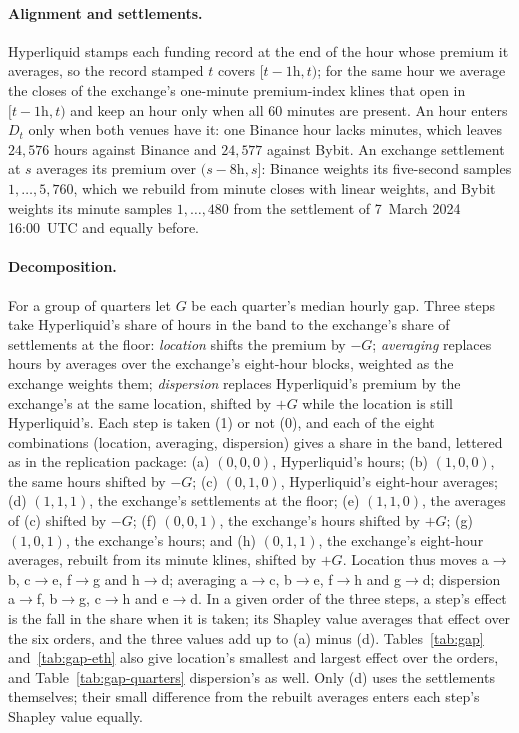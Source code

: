 \documentclass[10pt,a4paper]{article}
\begin{document}
\paragraph{Alignment and settlements.} Hyperliquid stamps each funding record at the end of the hour whose premium it averages, so the record stamped $t$ covers $[t-1\text{h}, t)$; for the same hour we average the closes of the exchange's one-minute premium-index klines that open in $[t-1\text{h}, t)$ and keep an hour only when all $60$ minutes are present. An hour enters $D_t$ only when both venues have it: one Binance hour lacks minutes, which leaves $24{,}576$ hours against Binance and $24{,}577$ against Bybit. An exchange settlement at $s$ averages its premium over $(s-8\text{h}, s]$: Binance weights its five-second samples $1, \dots, 5{,}760$, which we rebuild from minute closes with linear weights, and Bybit weights its minute samples $1, \dots, 480$ from the settlement of 7~March 2024 16:00~UTC and equally before.

\paragraph{Decomposition.} For a group of quarters let $G$ be each quarter's median hourly gap. Three steps take Hyperliquid's share of hours in the band to the exchange's share of settlements at the floor: \emph{location} shifts the premium by $-G$; \emph{averaging} replaces hours by averages over the exchange's eight-hour blocks, weighted as the exchange weights them; \emph{dispersion} replaces Hyperliquid's premium by the exchange's at the same location, shifted by $+G$ while the location is still Hyperliquid's. Each step is taken (1) or not (0), and each of the eight combinations (location, averaging, dispersion) gives a share in the band, lettered as in the replication package: (a) $(0,0,0)$, Hyperliquid's hours; (b) $(1,0,0)$, the same hours shifted by $-G$; (c) $(0,1,0)$, Hyperliquid's eight-hour averages; (d) $(1,1,1)$, the exchange's settlements at the floor; (e) $(1,1,0)$, the averages of (c) shifted by $-G$; (f) $(0,0,1)$, the exchange's hours shifted by $+G$; (g) $(1,0,1)$, the exchange's hours; and (h) $(0,1,1)$, the exchange's eight-hour averages, rebuilt from its minute klines, shifted by $+G$. Location thus moves a$\to$b, c$\to$e, f$\to$g and h$\to$d; averaging a$\to$c, b$\to$e, f$\to$h and g$\to$d; dispersion a$\to$f, b$\to$g, c$\to$h and e$\to$d. In a given order of the three steps, a step's effect is the fall in the share when it is taken; its Shapley value averages that effect over the six orders, and the three values add up to (a) minus (d). Tables~\ref{tab:gap} and~\ref{tab:gap-eth} also give location's smallest and largest effect over the orders, and Table~\ref{tab:gap-quarters} dispersion's as well. Only (d) uses the settlements themselves; their small difference from the rebuilt averages enters each step's Shapley value equally.
\end{document}
